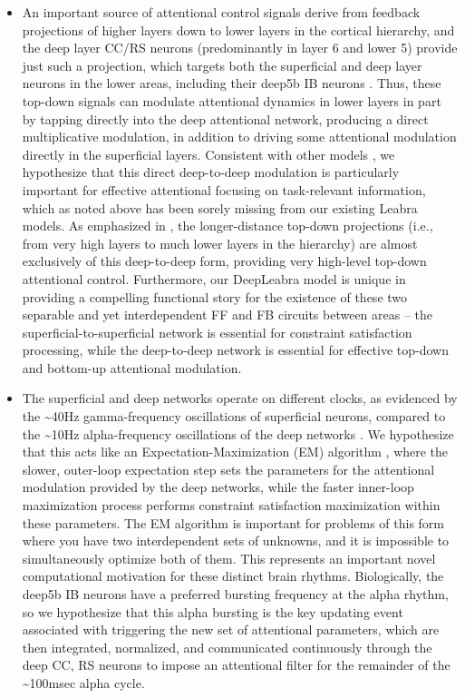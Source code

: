 \documentclass[11pt,twoside]{article}
\newif\myifpdf
\begin{document}
\begin{itemize}
\item An important source of attentional control signals derive from feedback projections of higher layers down to lower layers in the cortical hierarchy, and the deep layer CC/RS neurons (predominantly in layer 6 and lower 5) provide just such a projection, which targets both the superficial and deep layer neurons in the lower areas, including their deep5b IB neurons \cite{ThomsonLamy07,MarkovVezoliChameauEtAl14}.  Thus, these top-down signals can modulate attentional dynamics in lower layers in part by tapping directly into the deep attentional network, producing a direct multiplicative modulation, in addition to driving some attentional modulation directly in the superficial layers.  Consistent with other models \cite{Grossberg99,RaizadaGrossberg03,MontijnKlinkVanWezel12}, we hypothesize that this direct deep-to-deep modulation is particularly important for effective attentional focusing on task-relevant information, which as noted above has been sorely missing from our existing Leabra models.  As emphasized in , the longer-distance top-down projections (i.e., from very high layers to much lower layers in the hierarchy) are almost exclusively of this deep-to-deep form, providing very high-level top-down attentional control.  Furthermore, our DeepLeabra model is unique in providing a compelling functional story for the existence of these two separable and yet interdependent FF and FB circuits between areas -- the superficial-to-superficial network is essential for constraint satisfaction processing, while the deep-to-deep network is essential for effective top-down and bottom-up attentional modulation.

\item The superficial and deep networks operate on different clocks, as evidenced by the {\textasciitilde{}}40Hz gamma-frequency oscillations of superficial neurons, compared to the {\textasciitilde{}}10Hz alpha-frequency oscillations of the deep networks \cite{LorinczKekesiJuhaszEtAl09,FranceschettiGuatteoPanzicaEtAl95,BuffaloFriesLandmanEtAl11,LuczakBarthoHarris13}.  We hypothesize that this acts like an Expectation-Maximization (EM) algorithm \cite{DempsterLairdRubin77}, where the slower, outer-loop expectation step sets the parameters for the attentional modulation provided by the deep networks, while the faster inner-loop maximization process performs constraint satisfaction maximization within these parameters.  The EM algorithm is important for problems of this form where you have two interdependent sets of unknowns, and it is impossible to simultaneously optimize both of them.  This represents an important novel computational motivation for these distinct brain rhythms.  Biologically, the deep5b IB neurons have a preferred bursting frequency at the alpha rhythm, so we hypothesize that this alpha bursting is the key updating event associated with triggering the new set of attentional parameters, which are then integrated, normalized, and communicated continuously through the deep CC, RS neurons to impose an attentional filter for the remainder of the {\textasciitilde{}}100msec alpha cycle.


\end{itemize}
\end{document}

